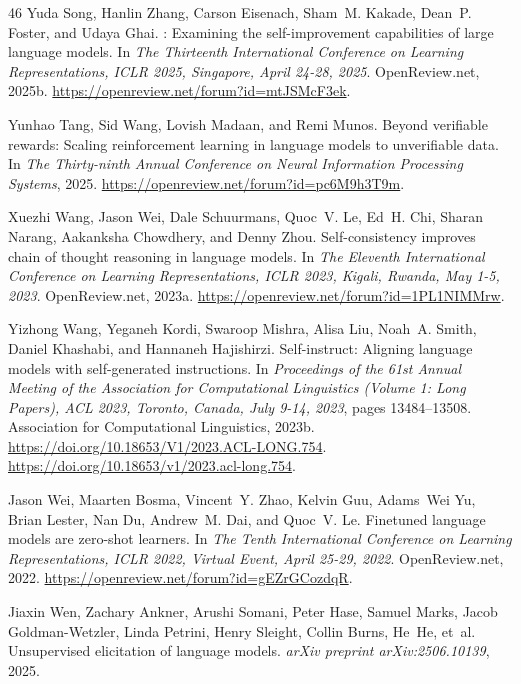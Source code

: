\begin{thebibliography}{46}
Yuda Song, Hanlin Zhang, Carson Eisenach, Sham~M. Kakade, Dean~P. Foster, and Udaya Ghai.
: Examining the self-improvement capabilities of large language models.
\newblock In \emph{The Thirteenth International Conference on Learning Representations, {ICLR} 2025, Singapore, April 24-28, 2025}. OpenReview.net, 2025{b}.
\newblock \url{https://openreview.net/forum?id=mtJSMcF3ek}.

Yunhao Tang, Sid Wang, Lovish Madaan, and Remi Munos.
\newblock Beyond verifiable rewards: Scaling reinforcement learning in language models to unverifiable data.
\newblock In \emph{The Thirty-ninth Annual Conference on Neural Information Processing Systems}, 2025.
\newblock \url{https://openreview.net/forum?id=pc6M9h3T9m}.

Xuezhi Wang, Jason Wei, Dale Schuurmans, Quoc~V. Le, Ed~H. Chi, Sharan Narang, Aakanksha Chowdhery, and Denny Zhou.
\newblock Self-consistency improves chain of thought reasoning in language models.
\newblock In \emph{The Eleventh International Conference on Learning Representations, {ICLR} 2023, Kigali, Rwanda, May 1-5, 2023}. OpenReview.net, 2023{a}.
\newblock \url{https://openreview.net/forum?id=1PL1NIMMrw}.

Yizhong Wang, Yeganeh Kordi, Swaroop Mishra, Alisa Liu, Noah~A. Smith, Daniel Khashabi, and Hannaneh Hajishirzi.
\newblock Self-instruct: Aligning language models with self-generated instructions.
\newblock In \emph{Proceedings of the 61st Annual Meeting of the Association for Computational Linguistics (Volume 1: Long Papers), {ACL} 2023, Toronto, Canada, July 9-14, 2023}, pages 13484--13508. Association for Computational Linguistics, 2023{b}.
\newblock \url{https://doi.org/10.18653/V1/2023.ACL-LONG.754}.
\newblock \url{https://doi.org/10.18653/v1/2023.acl-long.754}.

Jason Wei, Maarten Bosma, Vincent~Y. Zhao, Kelvin Guu, Adams~Wei Yu, Brian Lester, Nan Du, Andrew~M. Dai, and Quoc~V. Le.
\newblock Finetuned language models are zero-shot learners.
\newblock In \emph{The Tenth International Conference on Learning Representations, {ICLR} 2022, Virtual Event, April 25-29, 2022}. OpenReview.net, 2022.
\newblock \url{https://openreview.net/forum?id=gEZrGCozdqR}.

Jiaxin Wen, Zachary Ankner, Arushi Somani, Peter Hase, Samuel Marks, Jacob Goldman-Wetzler, Linda Petrini, Henry Sleight, Collin Burns, He~He, et~al.
\newblock Unsupervised elicitation of language models.
\newblock \emph{arXiv preprint arXiv:2506.10139}, 2025.


\end{thebibliography}
